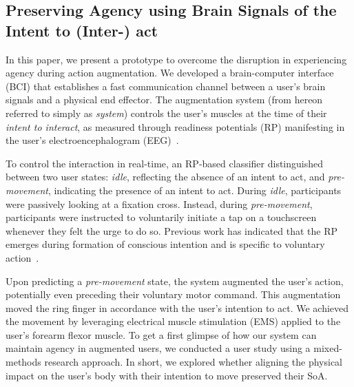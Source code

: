 \subsection{Preserving Agency using Brain Signals of the Intent to (Inter-) act}
In this paper, we present a prototype to overcome the disruption in experiencing agency during action augmentation. We developed a brain-computer interface (BCI) that establishes a fast communication channel between a user's brain signals and a physical end effector. The augmentation system (from hereon referred to simply as \textit{system}) controls the user's muscles at the time of their \textit{intent to interact}, as measured through readiness potentials (RP) manifesting in the user's electroencephalogram (EEG)~\cite{Schurger2021-vp, Schultze-Kraft2016-bx, Schultze-Kraft2021-cu}. 


To control the interaction in real-time, an RP-based classifier distinguished between two user states: \textit{idle}, reflecting the absence of an intent to act, and \textit{pre-movement}, indicating the presence of an intent to act. During \textit{idle}, participants were passively looking at a fixation cross. Instead, during \textit{pre-movement}, participants were instructed to voluntarily initiate a tap on a touchscreen whenever they felt the urge to do so. Previous work has indicated that the RP emerges during formation of conscious intention and is specific to voluntary action~\cite{Schultze-Kraft2020-rm, Travers2020-hf, Pares-Pujolras2019-ll}.

Upon predicting a \textit{pre-movement} state, the system augmented the user's action, potentially even preceding their voluntary motor command. This augmentation moved the ring finger in accordance with the user's intention to act. We achieved the movement by leveraging electrical muscle stimulation (EMS) applied to the user's forearm flexor muscle. To get a first glimpse of how our system can maintain agency in augmented users, we conducted a user study using a mixed-methods research approach. In short, we explored whether aligning the physical impact on the user's body with their intention to move preserved their SoA.



